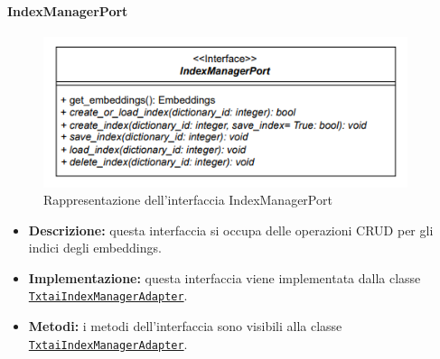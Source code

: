 \paragraph{IndexManagerPort} \label{IndexManagerPort}
\begin{figure}[H]
    \centering
    \includegraphics[width=0.95\textwidth]{assets/Backend/index_manager_port.png}
    \caption{Rappresentazione dell'interfaccia IndexManagerPort}
  \end{figure}
\begin{itemize}
    \item \textbf{Descrizione:} questa interfaccia si occupa delle operazioni CRUD per gli indici degli embeddings.
    \item \textbf{Implementazione:} questa interfaccia viene implementata dalla classe \hyperref[TxtaiIndexManagerAdapter]{\texttt{TxtaiIndexManagerAdapter}}.
    \item \textbf{Metodi:} i metodi dell'interfaccia sono visibili alla classe \hyperref[TxtaiIndexManagerAdapter]{\texttt{TxtaiIndexManagerAdapter}}.
\end{itemize} 

